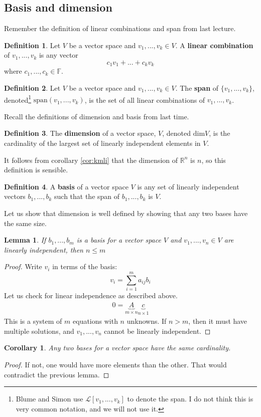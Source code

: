 \documentclass[12pt,reqno]{amsart}
\newtheorem{corollary}{Corollary}[section]
\newtheorem{lemma}{Lemma}[section]
\theoremstyle{definition}
\newtheorem{definition}{Definition}[section]
\def\F{\mathbb{F}}
\def\R{\mathbb{R}}
\newcommand{\spn}{\mathrm{span}}
\renewcommand{\dim}{\mathrm{dim}}
\begin{document}
\subsection{Basis and dimension}
Remember the definition of linear combinations and span from last
lecture.
\begin{definition}
  Let $V$ be a vector space and $v_1,..., v_k \in V$. A \textbf{linear
  combination} of $v_1,..., v_k$ is any vector 
  \[c_1 v_1 + ... + c_k v_k \]
  where $c_1, ..., c_k \in \F$. 
\end{definition}
\begin{definition}
  Let $V$ be a vector space and $v_1,..., v_k \in V$. The
  \textbf{span} of $\{ v_1, ... , v_k \}$, denoted\footnote{Blume and
    Simon use $\mathcal{L}[v_1,...,v_k]$ to denote the span. I do not
    think this is very common notation, and we will not use it.}
  $\spn(v_1,...,v_k)$, is the set of all linear combinations of $v_1,
  ... , v_k$.
\end{definition}
Recall the definitions of dimension and basis from last time.
\begin{definition}
  The \textbf{dimension} of a vector space, $V$, denoted $\dim V$, is
  the cardinality of the largest set of linearly independent elements
  in $V$.
\end{definition} 
It follows from corollary \ref{cor:kmli} that the dimension of $\R^n$
is $n$, so this definition is sensible. 
\begin{definition}
  A \textbf{basis} of a vector space $V$ is any set of linearly
  independent vectors $b_1, ..., b_k$ such that the span of $b_1, ...,
  b_k$ is $V$.
\end{definition}
Let us show that dimension is well defined by showing that any two
bases have the same size.
\begin{lemma}
  If $b_1,..., b_m$ is a basis for a vector space $V$ and $v_1, ...,
  v_n\in V$ are linearly independent, then $n \leq m$
\end{lemma}
\begin{proof}
  Write $v_i$ in terms of the basis:
  \[ v_i = \sum_{i=1}^m a_{ij} b_i \]
  Let us check for linear independence as described above. 
  \begin{align*}
    0 = \underbrace{A}_{m \times n} \underbrace{c}_{n \times 1}    
  \end{align*}
  This is a system of $m$ equations with $n$ unknowns. If $n>m$, then
  it must have multiple solutions, and $v_1,...,v_n$ cannot be
  linearly independent.
\end{proof}
\begin{corollary}
  Any two bases for a vector space have the same cardinality.
\end{corollary}
\begin{proof}
  If not, one would have more elements than the other. That would
  contradict the previous lemma.
\end{proof}
\end{document}
